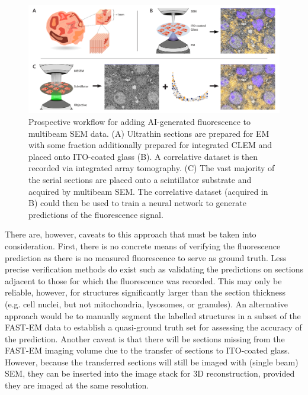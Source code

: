 \begin{figure}[!tb]
    \centering
    \includegraphics[width=\linewidth]{chapter-5/figures_PDF/fig5-2_mbsem.pdf}
    \caption{Prospective workflow for adding AI-generated fluorescence to multibeam SEM data. (A) Ultrathin sections are prepared for EM with some fraction additionally prepared for integrated CLEM and placed onto ITO-coated glass (B). A correlative dataset is then recorded via integrated array tomography. (C) The vast majority of the serial sections are placed onto a scintillator substrate and acquired by multibeam SEM. The correlative dataset (acquired in B) could then be used to train a neural network to generate predictions of the fluorescence signal.}
    \label{fig:5.2_mbsem}
\end{figure}

There are, however, caveats to this approach that must be taken into consideration. First, there is no concrete means of verifying the fluorescence prediction as there is no measured fluorescence to serve as ground truth. Less precise verification methods do exist such as validating the predictions on sections adjacent to those for which the fluorescence was recorded. This may only be reliable, however, for structures significantly larger than the section thickness (e.g. cell nuclei, but not mitochondria, lysosomes, or granules). An alternative approach would be to manually segment the labelled structures in a subset of the FAST-EM data to establish a quasi-ground truth set for assessing the accuracy of the prediction. Another caveat is that there will be sections missing from the FAST-EM imaging volume due to the transfer of sections to ITO-coated glass. However, because the transferred sections will still be imaged with (single beam) SEM, they can be inserted into the image stack for 3D reconstruction, provided they are imaged at the same resolution.
